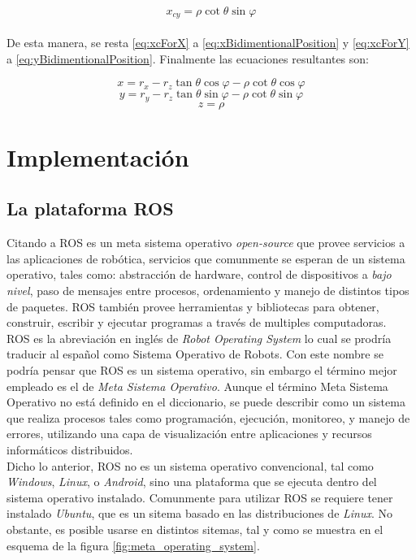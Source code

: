 \documentclass{book}
\begin{document}
\begin{equation}
\label{eq:xcForY}
x_{cy} = \rho \cot{\theta} \sin{\varphi}
\end{equation}\\

De esta manera, se resta \ref{eq:xcForX}  a \ref{eq:xBidimentionalPosition} y \ref{eq:xcForY} a \ref{eq:yBidimentionalPosition}. Finalmente las ecuaciones resultantes son:

\[x = r_x - r_z \tan{\theta} \cos{\varphi} - \rho \cot{\theta} \cos{\varphi}\]
\[y = r_y - r_z \tan{\theta} \sin{\varphi} - \rho \cot{\theta} \sin{\varphi}\]
\[z = \rho \]

\chapter{Implementación}
\section{La plataforma ROS}
Citando a \cite{pyo2015ros} ROS es un meta sistema operativo \textit{open-source} que provee servicios a las aplicaciones de robótica, servicios que comunmente se esperan de un sistema operativo, tales como: abstracción de hardware, control de dispositivos a \textit{bajo nivel}, paso de mensajes entre procesos, ordenamiento y manejo de distintos tipos de paquetes. ROS también provee herramientas y bibliotecas para obtener, construir, escribir y ejecutar programas a través de multiples computadoras.\\

ROS es la abreviación en inglés de \textit{Robot Operating System} lo cual se prodría traducir al español como Sistema Operativo de Robots. Con este nombre se podría pensar que ROS es un sistema operativo, sin embargo el término mejor empleado es el de \textit{Meta Sistema Operativo}. Aunque el término Meta Sistema Operativo no está definido en el diccionario, se puede describir como un sistema que realiza procesos tales como programación, ejecución, monitoreo, y manejo de errores, utilizando una capa de visualización entre aplicaciones y recursos informáticos distribuidos.\\

Dicho lo anterior, ROS no es un sistema operativo convencional, tal como \textit{Windows}, \textit{Linux}, o \textit{Android}, sino una plataforma que se ejecuta dentro del sistema operativo instalado. Comunmente para utilizar ROS se requiere tener instalado \textit{Ubuntu}, que es un sitema basado en las distribuciones de \textit{Linux}. No obstante, es posible usarse en distintos sitemas, tal y como se muestra en el esquema de la figura \ref{fig:meta_operating_system}. 
\end{document}
